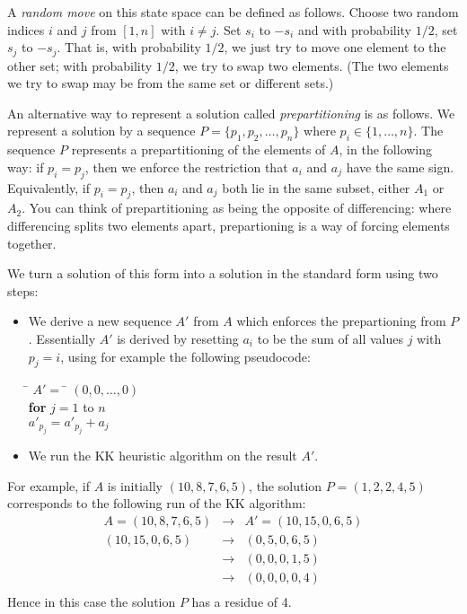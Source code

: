 \documentclass[11pt]{article}
\begin{document}
A {\em random move} on this state space can be defined as follows.
Choose two random indices $i$ and $j$ from $[1,n]$ with $i
\neq j$.  Set $s_i$ to $-s_i$ and with probability $1/2$, set $s_j$ to
$-s_j$.  That is, with probability $1/2$, we just try to move one element
to the other set;  with probability $1/2$, we try to swap two elements.
(The two elements we try to swap may be from the same set or different sets.)

An alternative way to represent a solution called {\em
prepartitioning} is as follows.  We represent a solution by a sequence
$P = \{p_1,p_2,\ldots,p_n\}$ where $p_i \in \{1,\ldots,n\}$.  The
sequence $P$ represents a prepartitioning of the elements of $A$, in
the following way: if $p_i = p_j$, then we enforce the restriction
that $a_i$ and $a_j$ have the same sign.  Equivalently, if $p_i =
p_j$, then $a_i$ and $a_j$ both lie in the same subset, either $A_1$
or $A_2$.  You can think of prepartitioning as being the opposite of
differencing:  where differencing splits two elements apart, prepartioning
is a way of forcing elements together.  

We turn a solution of this form into a solution in the standard
form using two steps:  
\begin{itemize}
\item We derive a new sequence $A'$ from $A$ which enforces the
prepartioning from $P$.  Essentially $A'$ is derived by resetting
$a_i$ to be the sum of all values $j$ with $p_j = i$, using for
example the following pseudocode:

\smallskip
\begin{tabbing}
\quad \quad \quad \= $A' =$ \= $(0,0,\ldots,0)$ \\
\> {\bf for} $j = 1$ to $n$ \\
\> \> $a'_{p_j} = a'_{p_j} + a_j$  \\
\end{tabbing}
\smallskip

\item We run the KK heuristic algorithm on the result $A'$.
\end{itemize}

For example, if $A$ is initially $(10,8,7,6,5)$, the solution $P = (1,2,2,4,5)$
corresponds to the following run of the KK algorithm:
\begin{eqnarray*}
A = (10,8,7,6,5) & \rightarrow & A' = (10,15,0,6,5) \\
(10,15,0,6,5) & \rightarrow & (0,5,0,6,5) \\
 & \rightarrow & (0,0,0,1,5) \\
 & \rightarrow & (0,0,0,0,4) \\
\end{eqnarray*}
Hence in this case the solution $P$ has a residue of 4.
\end{document}
